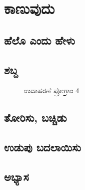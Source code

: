 \chapter{ಕಾಣುವುದು}

\section{ಹೆಲೊ ಎಂದು ಹೇಳು }

\section{ಶಬ್ದ }
\begin{figure}[h]
\begin{Scratch}[1]
\beginbox{}
\end{Scratch}
\caption{ಉದಾಹರಣೆ ಪ್ರೋಗ್ರಾಂ 4}
\end{figure}

\section{ತೋರಿಸು, ಬಚ್ಚಿಡು}

\section{ಉಡುಪು ಬದಲಾಯಿಸು}

\section{ಅಭ್ಯಾಸ }